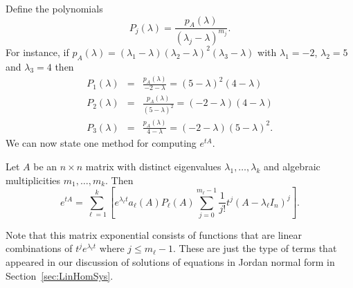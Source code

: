 \documentclass{ximera}
\begin{document}
Define the polynomials 
\begin{equation}  \label{e:Pj}
P_j(\lambda) = \frac{p_A(\lambda)}{(\lambda_j-\lambda)^{m_j}}.
\end{equation}
For instance, if 
$p_A(\lambda)=(\lambda_1-\lambda)(\lambda_2-\lambda)^2(\lambda_3-\lambda)$ 
with $\lambda_1 = -2$, $\lambda_2 = 5$ and $\lambda_3 = 4$ then
\begin{eqnarray*}
P_1(\lambda) &=& \frac{p_A(\lambda)}{-2-\lambda}=(5-\lambda)^2(4-\lambda)\\
P_2(\lambda) &=& \frac{p_A(\lambda)}{(5-\lambda)^2}=(-2-\lambda)(4-\lambda)\\
P_3(\lambda) &=& \frac{p_A(\lambda)}{4-\lambda}=(-2-\lambda)(5-\lambda)^2.
\end{eqnarray*}
We can now state one method for computing $e^{tA}$.
\begin{theorem} \label{T:etA}
Let $A$ be an $n\times n$ matrix with distinct eigenvalues 
$\lambda_1,\ldots,\lambda_k$ and algebraic multiplicities $m_1,\ldots,m_k$.  
Then
\[
e^{tA} = \sum_{\ell=1}^k \left[e^{\lambda_\ell t}a_\ell(A)P_\ell(A)
\sum_{j=0}^{m_\ell-1}\frac{1}{j!}t^j(A-\lambda_\ell I_n)^j\right].
\]
\end{theorem}

Note that this matrix exponential consists of functions that are linear 
combinations of $t^je^{\lambda_\ell t}$ where $j\leq m_\ell-1$.  These
are just the type of terms that appeared in our discussion of solutions 
of equations in Jordan normal form in Section~\ref{sec:LinHomSys}.
\end{document}
